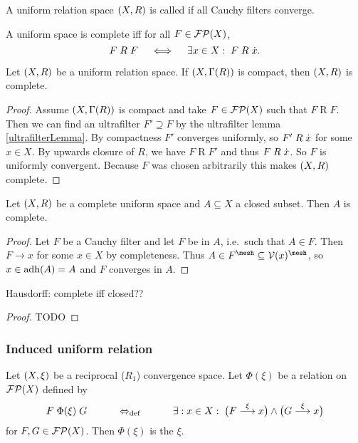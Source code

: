 \begin{definition}
A uniform relation space $\left( X,R \right)$ is called  if all Cauchy filters converge.
\end{definition}

A uniform space is complete iff for all $F\in\operatorname{\mathcal{FP}}(X)$,
\[ F\mathrel{R}F \quad\iff\quad \exists x\in X:\; F\mathrel{R}\dot{x}. \]


\begin{lemma}
Let $\left( X,R \right)$ be a uniform relation space. If $\left( X,\Gamma(R) \right)$ is compact, then $\left( X,R \right)$ is complete.
\end{lemma}
\begin{proof}
Assume $\left( X,\Gamma(R) \right)$ is compact and take $F\in\operatorname{\mathcal{FP}}(X)$ such that $F\mathrel{R}F$. Then we can find an ultrafilter $F'\supseteq F$ by the ultrafilter lemma \ref{ultrafilterLemma}. By compactness $F'$ converges uniformly, so $F'\mathrel{R}\dot{x}$ for some $x\in X$. By upwards closure of $R$, we have $F\mathrel{R} F'$ and thus $F \mathrel{R}\dot{x}$. So $F$ is uniformly convergent. Because $F$ was chosen arbitrarily this makes $\left( X,R \right)$ complete.
\end{proof}

\begin{proposition}
Let $\left( X,R \right)$ be a complete uniform space and $A\subseteq X$ a closed subset. Then $A$ is complete.
\end{proposition}
\begin{proof}
Let $F$ be a Cauchy filter and let $F$ be in $A$, i.e.\ such that $A \in F$. Then $F\to x$ for some $x\in X$ by completeness. Thus $A \in F^\mesh \subseteq \vicinity(x)^\mesh$, so $x\in \operatorname{adh}(A) = A$ and $F$ converges in $A$.
\end{proof}

\begin{proposition}
Hausdorff: complete iff closed??
\end{proposition}
\begin{proof}
TODO
\end{proof}


\subsubsection{Induced uniform relation}
\begin{definition}
Let $\left( X,\xi \right)$ be a reciprocal ($R_1$) convergence space. Let $\Phi(\xi)$ be a relation on $\operatorname{\mathcal{FP}}(X)$ defined by
\[ F\mathrel{\Phi(\xi)}G \qquad\quad\Leftrightarrow_{\text{def}}\quad\qquad \exists: x\in X: \; \big(F\overset{\xi}{\longrightarrow} x\big) \land \big(G\overset{\xi}{\longrightarrow} x\big) \]
for $F,G\in\operatorname{\mathcal{FP}}(X)$.
Then $\Phi(\xi)$ is the  $\xi$.
\end{definition}

